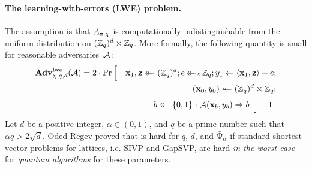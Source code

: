 \paragraph{The learning-with-errors (LWE) problem.} The \lwe assumption is that
$A_{\mathbf{z},\chi}$ is computationally indistinguishable from the uniform
distribution on $(\mathbb{Z}_q)^d \times \mathbb{Z}_q$. More formally, the following quantity is
small for reasonable adversaries~$\mathcal{A}$:
\begin{eqnarray*}
  \Adv{\lwe}_{\chi,q,d}(\advA) = 2\cdot \Pr\Big[&&
    \vecx_1, \vecz \getsr (\Z_q)^d;
    e \getsdist{\chi} \Z_q;
    y_1 \gets \inprod{\vecx_1, \vecz} + e;\\
  &&
    (\vecx_0, y_0) \getsr (\Z_q)^d \cross \Z_q;\\
  &&
    b \getsr \bits: \advA(\vecx_b, y_b) \outputs b
  \;\;\Big] - 1 \,.
\end{eqnarray*}
%
Let $d$ be a positive integer, $\alpha \in (0,1)$, and $q$ be a prime number
such that $\alpha q > 2\sqrt{d}$.
%
Oded Regev proved that \lwe is hard for $q$, $d$, and
$\bar{\mathrm{\Psi}}_\alpha$ if standard shortest vector problems for lattices,
i.e. SIVP and GapSVP, are hard \emph{in the worst case} for \emph{quantum
algorithms} \cite{regev05} for these parameters.

